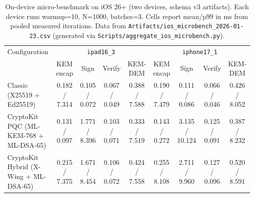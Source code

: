 \begin{table}[!t]
\centering
\caption{On-device micro-benchmark on iOS 26+ (two devices, schema v3 artifacts). Each device runs warmup=10, N=1000, batches=3. Cells report mean/p99 in ms from pooled measured iterations. Data from \texttt{Artifacts/ios\_microbench\_2026-01-23.csv} (generated via \texttt{Scripts/aggregate\_ios\_microbench.py}).}
\label{tab:ios-microbench}
{\setlength{\tabcolsep}{3pt}\scriptsize
\begin{tabular}{@{}lcccccccc@{}}
\toprule
Configuration & \multicolumn{4}{c}{\texttt{ipad16\_3}} & \multicolumn{4}{c}{\texttt{iphone17\_1}} \\
\cmidrule(lr){2-5}\cmidrule(lr){6-9}
& KEM encap & Sign & Verify & KEM-DEM & KEM encap & Sign & Verify & KEM-DEM \\
\midrule
Classic (X25519 + Ed25519) & 0.182 / 7.314 & 0.105 / 0.072 & 0.067 / 0.049 & 0.388 / 7.588 & 0.190 / 7.479 & 0.111 / 0.086 & 0.066 / 0.046 & 0.426 / 8.052 \\
CryptoKit PQC (ML-KEM-768 + ML-DSA-65) & 0.131 / 0.097 & 1.771 / 8.396 & 0.103 / 0.071 & 0.333 / 7.519 & 0.143 / 0.272 & 3.135 / 10.124 & 0.125 / 0.091 & 0.387 / 8.232 \\
CryptoKit Hybrid (X-Wing + ML-DSA-65) & 0.215 / 7.375 & 1.671 / 8.454 & 0.106 / 0.072 & 0.424 / 7.558 & 0.255 / 8.108 & 2.711 / 9.960 & 0.127 / 0.096 & 0.520 / 8.591 \\
\bottomrule
\end{tabular}
}
\end{table}
